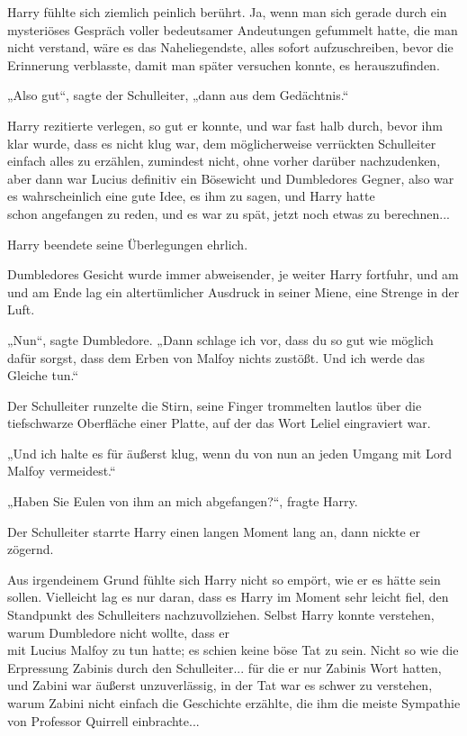 {Harry fühlte sich ziemlich peinlich berührt. Ja, wenn man sich gerade durch ein mysteriöses Gespräch voller bedeutsamer Andeutungen gefummelt hatte, die man nicht verstand, wäre es das Naheliegendste, alles sofort aufzuschreiben, bevor die Erinnerung verblasste, damit man später versuchen konnte, es herauszufinden.

„Also gut“, sagte der Schulleiter, „dann aus dem Gedächtnis.“

Harry rezitierte verlegen, so gut er konnte, und war fast halb durch, bevor ihm klar wurde, dass es nicht klug war, dem möglicherweise verrückten Schulleiter einfach alles zu erzählen, zumindest nicht, ohne vorher darüber nachzudenken, aber dann war Lucius definitiv ein Bösewicht und Dumbledores Gegner, also war es wahrscheinlich eine gute Idee, es ihm zu sagen, und Harry hatte\\ schon angefangen zu reden, und es war zu spät, jetzt noch etwas zu berechnen...

Harry beendete seine Überlegungen ehrlich.

Dumbledores Gesicht wurde immer abweisender, je weiter Harry fortfuhr, und am\\ und am Ende lag ein altertümlicher Ausdruck in seiner Miene, eine Strenge in der Luft.

„Nun“, sagte Dumbledore. „Dann schlage ich vor, dass du so gut wie möglich dafür sorgst, dass dem Erben von Malfoy nichts zustößt. Und ich werde das Gleiche tun.“

Der Schulleiter runzelte die Stirn, seine Finger trommelten lautlos über die tiefschwarze Oberfläche einer Platte, auf der das Wort Leliel eingraviert war.

„Und ich halte es für äußerst klug, wenn du von nun an jeden Umgang mit Lord Malfoy vermeidest.“

„Haben Sie Eulen von ihm an mich abgefangen?“, fragte Harry.

Der Schulleiter starrte Harry einen langen Moment lang an, dann nickte er zögernd.

Aus irgendeinem Grund fühlte sich Harry nicht so empört, wie er es hätte sein sollen. Vielleicht lag es nur daran, dass es Harry im Moment sehr leicht fiel, den Standpunkt des Schulleiters nachzuvollziehen. Selbst Harry konnte verstehen, warum Dumbledore nicht wollte, dass er\\ mit Lucius Malfoy zu tun hatte; es schien keine böse Tat zu sein. Nicht so wie die Erpressung Zabinis durch den Schulleiter... für die er nur Zabinis Wort hatten, und Zabini war äußerst unzuverlässig, in der Tat war es schwer zu verstehen, warum Zabini nicht einfach die Geschichte erzählte, die ihm die meiste Sympathie von Professor Quirrell einbrachte...

}
